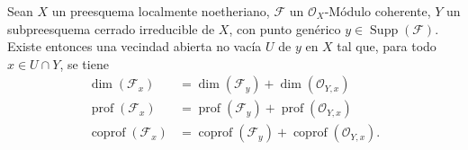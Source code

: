 \begin{proposition}[6.10.6]
\label{IV.2.s6.10.6-fr}
Sean $X$ un preesquema localmente noetheriano, $\mathcal F$ un
$\mathcal O_X$-Módulo coherente, $Y$ un subpreesquema cerrado irreducible de
$X$, con punto genérico $y\in\operatorname{Supp}(\mathcal F)$. Existe
entonces una vecindad abierta no vacía $U$ de $y$ en $X$ tal que, para todo
$x\in U\cap Y$, se tiene
\begin{align}
\dim(\mathcal F_x)&=\dim(\mathcal F_y)+\dim(\mathcal O_{Y,x})
\tag{6.10.6.1}\label{IV.2.s6.10.6.1-fr}\\
\operatorname{prof}(\mathcal F_x)&=\operatorname{prof}(\mathcal F_y)+
\operatorname{prof}(\mathcal O_{Y,x})
\tag{6.10.6.2}\label{IV.2.s6.10.6.2-fr}\\
\operatorname{coprof}(\mathcal F_x)&=\operatorname{coprof}(\mathcal F_y)+
\operatorname{coprof}(\mathcal O_{Y,x}).
\tag{6.10.6.3}\label{IV.2.s6.10.6.3-fr}
\end{align}
\end{proposition}

